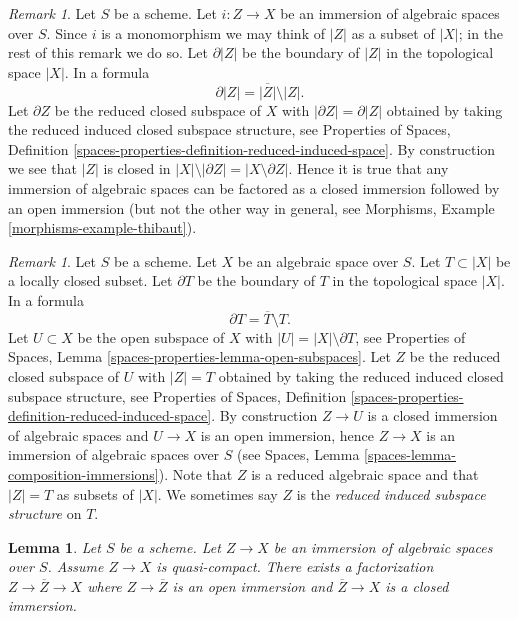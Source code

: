 \documentclass{stacks-project}
\theoremstyle{plain}
\newtheorem{lemma}[subsection]{Lemma}
\theoremstyle{definition}
\theoremstyle{remark}
\newtheorem{remark}[subsection]{Remark}
\numberwithin{equation}{subsection}
\begin{document}
\begin{remark}
\label{remark-immersion}
Let $S$ be a scheme. Let $i : Z \to X$ be an immersion of algebraic
spaces over $S$. Since $i$ is a monomorphism we may think of $|Z|$ as
a subset of $|X|$; in the rest of this remark we do so.
Let $\partial |Z|$ be the boundary of $|Z|$ in
the topological space $|X|$. In a formula
$$
\partial |Z| = \overline{|Z|} \setminus |Z|.
$$
Let $\partial Z$ be the reduced closed subspace of $X$ with
$|\partial Z| = \partial |Z|$
obtained by taking the reduced induced closed subspace structure, see
Properties of Spaces,
Definition \ref{spaces-properties-definition-reduced-induced-space}.
By construction we see that $|Z|$ is closed in
$|X| \setminus |\partial Z| = |X \setminus \partial Z|$.
Hence it is true that any immersion of algebraic spaces can be
factored as a closed immersion followed by an open immersion
(but not the other way in general, see
Morphisms, Example \ref{morphisms-example-thibaut}).
\end{remark}

\begin{remark}
\label{remark-space-structure-locally-closed-subset}
Let $S$ be a scheme. Let $X$ be an algebraic space over $S$.
Let $T \subset |X|$ be a locally closed subset.
Let $\partial T$ be the boundary of $T$ in
the topological space $|X|$. In a formula
$$
\partial T = \overline{T} \setminus T.
$$
Let $U \subset X$ be the open subspace of $X$ with
$|U| = |X| \setminus \partial T$, see
Properties of Spaces, Lemma \ref{spaces-properties-lemma-open-subspaces}.
Let $Z$ be the reduced closed subspace of $U$ with
$|Z| = T$ obtained by taking the reduced induced
closed subspace structure, see
Properties of Spaces,
Definition \ref{spaces-properties-definition-reduced-induced-space}.
By construction $Z \to U$ is a closed immersion of algebraic spaces
and $U \to X$ is an open immersion, hence
$Z \to X$ is an immersion of algebraic spaces over $S$ (see
Spaces, Lemma \ref{spaces-lemma-composition-immersions}).
Note that $Z$ is a reduced algebraic space and that
$|Z| = T$ as subsets of $|X|$. We sometimes say
$Z$ is the {\it reduced induced subspace structure} on $T$.
\end{remark}

\begin{lemma}
\label{lemma-factor-the-other-way}
Let $S$ be a scheme. Let $Z \to X$ be an immersion of algebraic spaces over
$S$. Assume $Z \to X$ is quasi-compact.
There exists a factorization $Z \to \overline{Z} \to X$ where
$Z \to \overline{Z}$ is an open immersion and $\overline{Z} \to X$
is a closed immersion.
\end{lemma}
\end{document}
